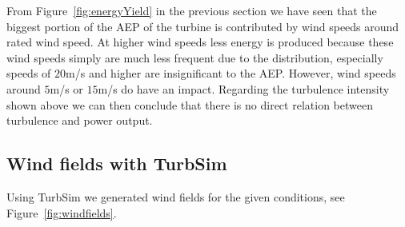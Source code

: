 \documentclass[10pt]{article}
\begin{document}
From Figure~\ref{fig:energyYield} in the previous section we have seen that the biggest portion of the AEP of the turbine is contributed by wind speeds around rated wind speed. At higher wind speeds less energy is produced because these wind speeds simply are much less frequent due to the distribution, especially speeds of $20$m/s and higher are insignificant to the AEP. However, wind speeds around $5$m/s or $15$m/s do have an impact. Regarding the turbulence intensity shown above we can then conclude that there is no direct relation between turbulence and power output. 

\subsection{Wind fields with TurbSim}
Using TurbSim we generated wind fields for the given conditions, see Figure~\ref{fig:windfields}.
\end{document}

